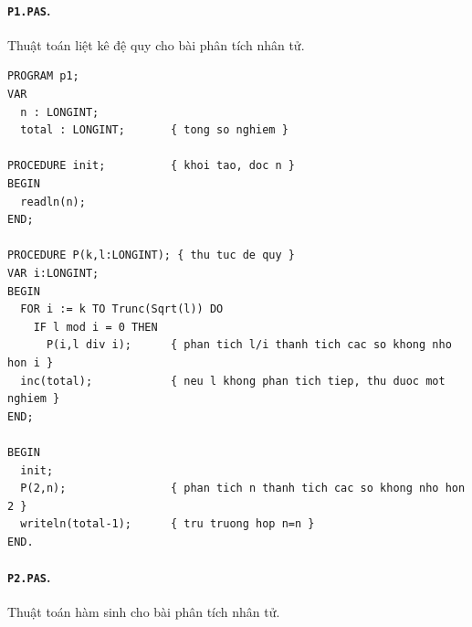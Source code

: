 \documentclass[11pt]{article}
\begin{document}
\paragraph{\texttt{P1.PAS}.}
Thuật toán liệt kê đệ quy cho bài phân tích nhân tử.

\begin{verbatim}
PROGRAM p1;
VAR
  n : LONGINT;
  total : LONGINT;       { tong so nghiem }

PROCEDURE init;          { khoi tao, doc n }
BEGIN
  readln(n);
END;

PROCEDURE P(k,l:LONGINT); { thu tuc de quy }
VAR i:LONGINT;
BEGIN
  FOR i := k TO Trunc(Sqrt(l)) DO
    IF l mod i = 0 THEN
      P(i,l div i);      { phan tich l/i thanh tich cac so khong nho hon i }
  inc(total);            { neu l khong phan tich tiep, thu duoc mot nghiem }
END;

BEGIN
  init;
  P(2,n);                { phan tich n thanh tich cac so khong nho hon 2 }
  writeln(total-1);      { tru truong hop n=n }
END.
\end{verbatim}

\paragraph{\texttt{P2.PAS}.}
Thuật toán hàm sinh cho bài phân tích nhân tử.
\end{document}
